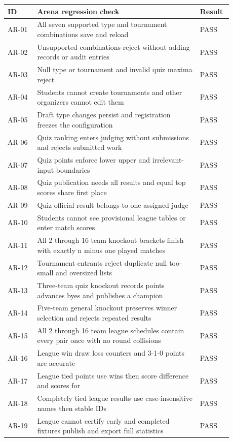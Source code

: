 \small\begin{longtable}{p{0.12\linewidth}p{0.66\linewidth}p{0.1\linewidth}}\toprule ID & Arena regression check & Result\\\midrule\endhead
AR-01 & All seven supported type and tournament combinations save and reload & PASS\\
AR-02 & Unsupported combinations reject without adding records or audit entries & PASS\\
AR-03 & Null type or tournament and invalid quiz maxima reject & PASS\\
AR-04 & Students cannot create tournaments and other organizers cannot edit them & PASS\\
AR-05 & Draft type changes persist and registration freezes the configuration & PASS\\
AR-06 & Quiz ranking enters judging without submissions and rejects submitted work & PASS\\
AR-07 & Quiz points enforce lower upper and irrelevant-input boundaries & PASS\\
AR-08 & Quiz publication needs all results and equal top scores share first place & PASS\\
AR-09 & Quiz official result belongs to one assigned judge & PASS\\
AR-10 & Students cannot see provisional league tables or enter match scores & PASS\\
AR-11 & All 2 through 16 team knockout brackets finish with exactly n minus one played matches & PASS\\
AR-12 & Tournament entrants reject duplicate null too-small and oversized lists & PASS\\
AR-13 & Three-team quiz knockout records points advances byes and publishes a champion & PASS\\
AR-14 & Five-team general knockout preserves winner selection and rejects repeated results & PASS\\
AR-15 & All 2 through 16 team league schedules contain every pair once with no round collisions & PASS\\
AR-16 & League win draw loss counters and 3-1-0 points are accurate & PASS\\
AR-17 & League tied points use wins then score difference and scores for & PASS\\
AR-18 & Completely tied league results use case-insensitive names then stable IDs & PASS\\
AR-19 & League cannot certify early and completed fixtures publish and export full statistics & PASS\\

\end{longtable}
